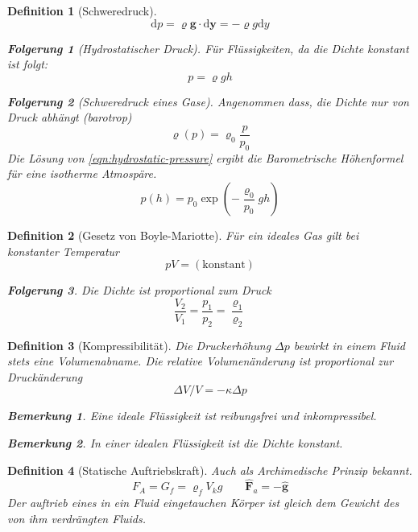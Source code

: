 \documentclass[a4paper, twocolumn]{article}
\numberwithin{equation}{section}
\theoremstyle{hsr-def}
\newtheorem{definition}{Definition}[section]
\theoremstyle{hsr-sub}
\newtheorem{result}{Folgerung}[definition]
\theoremstyle{hsr-unnum}
\newtheorem{remark}{Bemerkung}[definition]
\newcommand{\dd}[1]{\ensuremath{\mathrm{d}#1}}
\renewcommand{\vec}[1]{\ensuremath{\mathbf{#1}}}
\newcommand{\uvec}[1]{\ensuremath{\vec{\hat{#1}}}}
\begin{document}
\begin{definition}[Schweredruck]
\begin{equation} \label{eqn:hydrostatic-pressure}
    \dd{p} = \varrho \vec{g} \cdot \dd{\vec{y}} = - \varrho g \dd{y}
\end{equation}

\begin{result}[Hydrostatischer Druck]
F\"ur Fl\"ussigkeiten, da die Dichte konstant ist folgt:
\[
    p = \varrho g h
\]
\end{result}

\begin{result}[Schweredruck eines Gase]
Angenommen dass, die Dichte nur von Druck abh\"angt (barotrop)
\[
    \varrho(p) = \varrho_0 \frac{p}{p_0}
\]
Die L\"osung von \eqref{eqn:hydrostatic-pressure} ergibt die \emph{Barometrische H\"ohenformel} f\"ur eine isotherme Atmosp\"are.
\[
    p(h) = p_0 \exp\left(-\frac{\varrho_0}{p_0} gh\right)
\]
\end{result}
\end{definition}

\begin{definition}[Gesetz von Boyle-Mariotte]
F\"ur ein ideales Gas gilt bei konstanter Temperatur
\[
    pV = (\text{konstant})
\]

\begin{result}
Die Dichte ist proportional zum Druck
\[
    \frac{V_2}{V_1} = \frac{p_1}{p_2} = \frac{\varrho_1}{\varrho_2}
\]
\end{result}
\end{definition}


\begin{definition}[Kompressibilit\"at]
Die Druckerh\"ohung \(\Delta p\) bewirkt in einem Fluid stets eine Volumenabname.
Die relative Volumen\"anderung ist proportional zur Druck\"anderung
\[
    \Delta V / V = - \kappa \Delta p
\]

\begin{remark}
    Eine ideale Fl\"ussigkeit ist reibungsfrei und inkompressibel.
\end{remark}

\begin{remark}
    In einer idealen Fl\"ussigkeit ist die Dichte konstant.
\end{remark}
\end{definition}

\begin{definition}[Statische Auftriebskraft] Auch als Archimedische Prinzip bekannt.
\[
    F_A = G_f = \varrho_f  V_k g
    \qquad
    \uvec{F}_a = - \uvec{g}
\]
Der auftrieb eines in ein Fluid eingetauchen K\"orper ist gleich dem Gewicht des von ihm verdr\"angten Fluids.
\end{definition}
\end{document}
